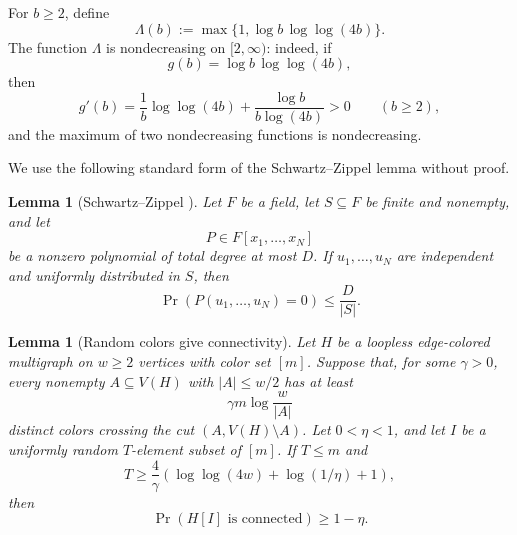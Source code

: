 \documentclass[10pt,a4paper]{amsart}
\newtheorem{lemma}[theorem]{Lemma}
\begin{document}
For \(b\ge 2\), define
\[
\Lambda(b):=\max\{1,\log b\,\log\log(4b)\}.
\]
The function \(\Lambda\) is nondecreasing on \([2,\infty)\): indeed, if
\[
g(b)=\log b\,\log\log(4b),
\]
then
\[
g'(b)=\frac{1}{b}\log\log(4b)+\frac{\log b}{b\log(4b)}>0
\qquad(b\ge2),
\]
and the maximum of two nondecreasing functions is nondecreasing.

We use the following standard form of the Schwartz--Zippel lemma without proof.

\begin{lemma}[Schwartz--Zippel \cite{Schwartz,Zippel}]\label{lem:schwartz-zippel}
Let \(F\) be a field, let \(S\subseteq F\) be finite and nonempty, and let
\[
P\in F[x_1,\ldots,x_N]
\]
be a nonzero polynomial of total degree at most \(D\). If \(u_1,\ldots,u_N\) are independent and uniformly distributed in \(S\), then
\[
\Pr(P(u_1,\ldots,u_N)=0)\le \frac{D}{|S|}.
\]
\end{lemma}

\begin{lemma}[Random colors give connectivity]\label{lem:random-colors}
Let \(H\) be a loopless edge-colored multigraph on \(w\ge2\) vertices with color set \([m]\). Suppose that, for some \(\gamma>0\), every nonempty \(A\subseteq V(H)\) with \(|A|\le w/2\) has at least
\[
\gamma m\log\frac{w}{|A|}
\]
distinct colors crossing the cut \((A,V(H)\setminus A)\). Let \(0<\eta<1\), and let \(I\) be a uniformly random \(T\)-element subset of \([m]\). If \(T\le m\) and
\[
T\ge \frac4\gamma\left(\log\log(4w)+\log(1/\eta)+1\right),
\]
then
\[
\Pr(H[I]\text{ is connected})\ge 1-\eta.
\]
\end{lemma}
\end{document}
